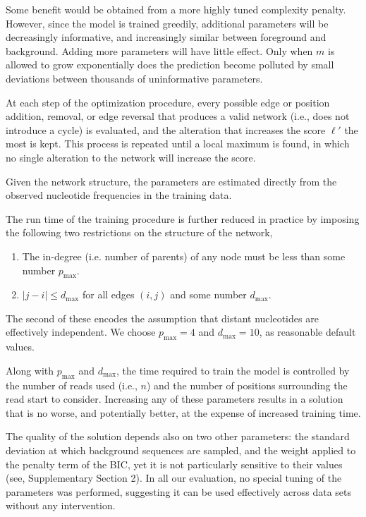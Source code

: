 \documentclass{bioinfo}
\begin{document}
Some benefit would be obtained from a more highly tuned complexity penalty.
However, since the model is trained greedily, additional parameters will be
decreasingly informative, and increasingly similar between foreground and
background. Adding more parameters will have little effect.  Only when $m$ is
allowed to grow exponentially does the prediction become polluted by small
deviations between thousands of uninformative parameters.

At each step of the optimization procedure, every possible edge or position
addition, removal, or edge reversal that produces a valid network (i.e., does not
introduce a cycle) is evaluated, and the alteration that increases the score
$\ell'$ the most is kept.  This process is repeated until a local maximum is
found, in which no single alteration to the network will increase the score.

Given the network structure, the parameters are estimated directly from the
observed nucleotide frequencies in the training data.

The run time of the training procedure is further reduced in practice by imposing the
following two restrictions on the structure of the network,
\begin{enumerate}
\item The in-degree (i.e. number of parents) of any node must be less than some
number $p_{\text{max}}$.
\item $|j - i| \le d_{\text{max}}$ for all edges $(i,j)$ and some number $d_{\text{max}}$.
\end{enumerate}
The second of these encodes the assumption that distant nucleotides are
effectively independent. We choose $p_{\text{max}} = 4$ and $d_{\text{max}} =
10$, as reasonable default values.

Along with $p_{\text{max}}$ and $d_{\text{max}}$, the time required to train the
model is controlled by the number of reads used (i.e., $n$) and the number of
positions surrounding the read start to consider. Increasing any of these
parameters results in a solution that is no worse, and potentially better, at
the expense of increased training time.

The quality of the solution depends also on two other parameters: the standard
deviation at which background sequences are sampled, and the weight applied to
the penalty term of the BIC, yet it is not particularly sensitive to their values
(see, Supplementary Section 2). In all our evaluation, no special tuning of the
parameters was performed, suggesting it can be used effectively across data sets
without any intervention.
\end{document}
